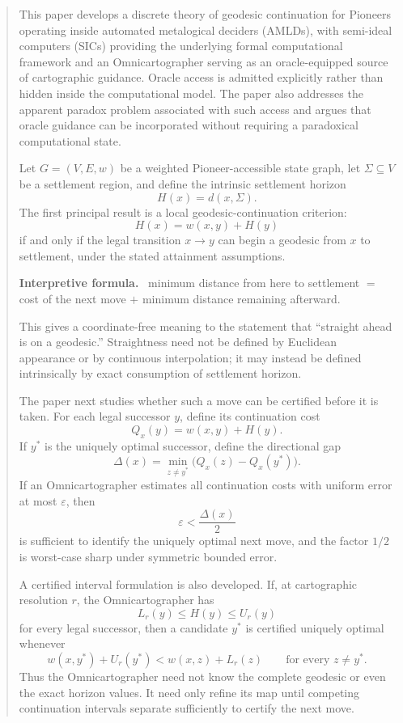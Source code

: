 \documentclass[11pt]{article}
\theoremstyle{definition}
\theoremstyle{remark}
\newcommand{\Sett}{\Sigma}
\newcommand{\Qval}{Q}
\newcommand{\Gap}{\Delta}
\newcommand{\eps}{\varepsilon}
\newenvironment{interpretiveformula}{%
  \begin{center}\begin{minipage}{0.92\textwidth}\small
  \textbf{Interpretive formula.}\ }{\end{minipage}\end{center}}
\begin{document}
\begin{abstract}
This paper develops a discrete theory of geodesic continuation for Pioneers operating inside automated metalogical deciders (AMLDs), with semi-ideal computers (SICs) providing the underlying formal computational framework and an Omnicartographer serving as an oracle-equipped source of cartographic guidance. Oracle access is admitted explicitly rather than hidden inside the computational model. The paper also addresses the apparent paradox problem associated with such access and argues that oracle guidance can be incorporated without requiring a paradoxical computational state.

Let $G=(V,E,w)$ be a weighted Pioneer-accessible state graph, let $\Sett\subseteq V$ be a settlement region, and define the intrinsic settlement horizon
\[
H(x)=d(x,\Sett).
\]
The first principal result is a local geodesic-continuation criterion:
\[
H(x)=w(x,y)+H(y)
\]
if and only if the legal transition $x\to y$ can begin a geodesic from $x$ to settlement, under the stated attainment assumptions.

\begin{interpretiveformula}
minimum distance from here to settlement $=$ cost of the next move $+$ minimum distance remaining afterward.
\end{interpretiveformula}

This gives a coordinate-free meaning to the statement that ``straight ahead is on a geodesic.'' Straightness need not be defined by Euclidean appearance or by continuous interpolation; it may instead be defined intrinsically by exact consumption of settlement horizon.

The paper next studies whether such a move can be certified before it is taken. For each legal successor $y$, define its continuation cost
\[
\Qval_x(y)=w(x,y)+H(y).
\]
If $y^*$ is the uniquely optimal successor, define the directional gap
\[
\Gap(x)=\min_{z\neq y^*}\bigl(\Qval_x(z)-\Qval_x(y^*)\bigr).
\]
If an Omnicartographer estimates all continuation costs with uniform error at most $\eps$, then
\[
\eps<\frac{\Gap(x)}{2}
\]
is sufficient to identify the uniquely optimal next move, and the factor $1/2$ is worst-case sharp under symmetric bounded error.

A certified interval formulation is also developed. If, at cartographic resolution $r$, the Omnicartographer has
\[
L_r(y)\le H(y)\le U_r(y)
\]
for every legal successor, then a candidate $y^*$ is certified uniquely optimal whenever
\[
w(x,y^*)+U_r(y^*)<w(x,z)+L_r(z)\qquad\text{for every }z\neq y^*.
\]
Thus the Omnicartographer need not know the complete geodesic or even the exact horizon values. It need only refine its map until competing continuation intervals separate sufficiently to certify the next move.


\end{abstract}
\end{document}
